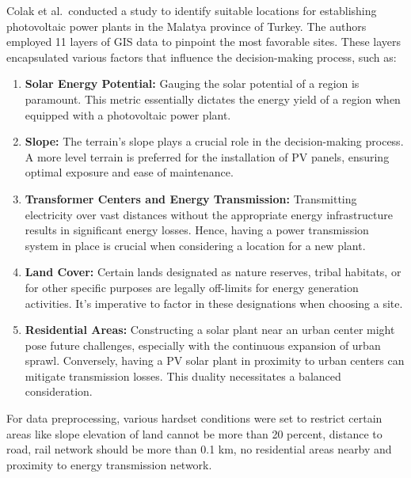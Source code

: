 \documentclass[a4paper,12pt]{Classes/RoboticsLaTeX}
\begin{document}
	Colak et al.\ conducted a study to identify suitable locations for establishing photovoltaic power plants in the Malatya province of Turkey\cite{colak2020}. The authors employed 11 layers of GIS data to pinpoint the most favorable sites. These layers encapsulated various factors that influence the decision-making process, such as:

	\begin{enumerate}
		\item \textbf{Solar Energy Potential:} Gauging the solar potential of a region is paramount. This metric essentially dictates the energy yield of a region when equipped with a photovoltaic power plant.
		
		\item \textbf{Slope:} The terrain's slope plays a crucial role in the decision-making process. A more level terrain is preferred for the installation of \ac{PV} panels, ensuring optimal exposure and ease of maintenance.
		
		\item \textbf{Transformer Centers and Energy Transmission:} Transmitting electricity over vast distances without the appropriate energy infrastructure results in significant energy losses. Hence, having a power transmission system in place is crucial when considering a location for a new plant.
		
		\item \textbf{Land Cover:} Certain lands designated as nature reserves, tribal habitats, or for other specific purposes are legally off-limits for energy generation activities. It's imperative to factor in these designations when choosing a site.
		
		\item \textbf{Residential Areas:} Constructing a solar plant near an urban center might pose future challenges, especially with the continuous expansion of urban sprawl. Conversely, having a \ac{PV} solar plant in proximity to urban centers can mitigate transmission losses. This duality necessitates a balanced consideration.
	\end{enumerate}

	For data preprocessing, various hardset conditions were set to restrict certain areas like slope elevation of land cannot be more than 20 percent,
	distance to road, rail network should be more than 0.1 km, no residential areas nearby and proximity to energy transmission network.
\end{document}
